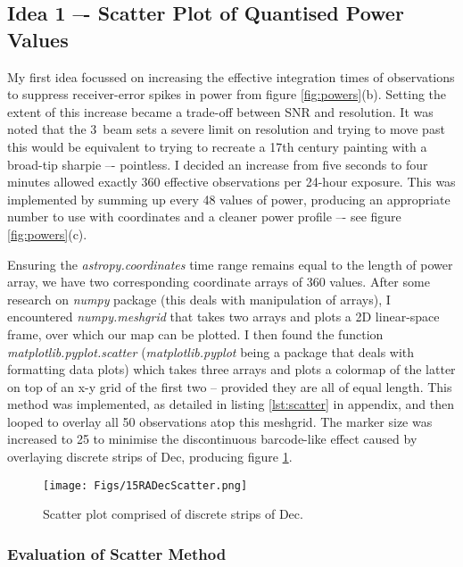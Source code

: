 \documentclass[11pt]{article} %
\begin{document}
\subsection{Idea 1 –- Scatter Plot of Quantised Power Values} \label{idea1}

My first idea focussed on increasing the effective integration times of observations to suppress receiver-error spikes in power from figure \ref{fig:powers}(b). Setting the extent of this increase became a trade-off between SNR and resolution. It was noted that the 3\degree~beam sets a severe limit on resolution and trying to move past this would be equivalent to trying to recreate a 17th century painting with a broad-tip sharpie –- pointless. I decided an increase from five seconds to four minutes allowed exactly 360 effective observations per 24-hour exposure. This was implemented by summing up every 48 values of power, producing an appropriate number to use with coordinates and a cleaner power profile –- see figure \ref{fig:powers}(c). 

Ensuring the \textit{astropy.coordinates} time range remains equal to the length of power array, we have two corresponding coordinate arrays of 360 values. After some research on \textit{numpy} package (this deals with manipulation of arrays), I encountered \textit{numpy.meshgrid} that takes two arrays and plots a 2D linear-space frame, over which our map can be plotted. I then found the function \textit{matplotlib.pyplot.scatter} (\textit{matplotlib.pyplot} being a package that deals with formatting data plots) which takes three arrays and plots a colormap of the latter on top of an x-y grid of the first two -- provided they are all of equal length. This method was implemented, as detailed in listing \ref{lst:scatter} in appendix, and then looped to overlay all 50 observations atop this meshgrid. The marker size was increased to 25 to minimise the discontinuous barcode-like effect caused by overlaying discrete strips of Dec, producing figure \ref{fig:scatter}.

\begin{figure}
\centering
\texttt{[image: Figs/15RADecScatter.png]}
\caption{Scatter plot comprised of discrete strips of Dec.}
\label{fig:scatter}
\end{figure}

\subsubsection{Evaluation of Scatter Method} \label{idea1 eval}
\end{document}
